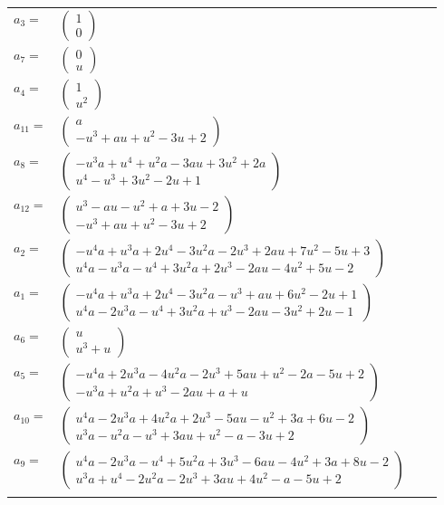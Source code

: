 \documentclass[1p]{elsarticle_modified}
\theoremstyle{definition}
\begin{document}
\begin{tabular}{m{7pt} m{180pt} m{7pt} m{180pt} }
\flushright $a_{3}=$&$\begin{pmatrix}1\\0\end{pmatrix}$ \\
\flushright $a_{7}=$&$\begin{pmatrix}0\\u\end{pmatrix}$ \\
\flushright $a_{4}=$&$\begin{pmatrix}1\\u^2\end{pmatrix}$ \\
\flushright $a_{11}=$&$\begin{pmatrix}a\\- u^3+a u+u^2-3 u+2\end{pmatrix}$ \\
\flushright $a_{8}=$&$\begin{pmatrix}- u^3 a+u^4+u^2 a-3 a u+3 u^2+2 a\\u^4- u^3+3 u^2-2 u+1\end{pmatrix}$ \\
\flushright $a_{12}=$&$\begin{pmatrix}u^3- a u- u^2+a+3 u-2\\- u^3+a u+u^2-3 u+2\end{pmatrix}$ \\
\flushright $a_{2}=$&$\begin{pmatrix}- u^4 a+u^3 a+2 u^4-3 u^2 a-2 u^3+2 a u+7 u^2-5 u+3\\u^4 a- u^3 a- u^4+3 u^2 a+2 u^3-2 a u-4 u^2+5 u-2\end{pmatrix}$ \\
\flushright $a_{1}=$&$\begin{pmatrix}- u^4 a+u^3 a+2 u^4-3 u^2 a- u^3+a u+6 u^2-2 u+1\\u^4 a-2 u^3 a- u^4+3 u^2 a+u^3-2 a u-3 u^2+2 u-1\end{pmatrix}$ \\
\flushright $a_{6}=$&$\begin{pmatrix}u\\u^3+u\end{pmatrix}$ \\
\flushright $a_{5}=$&$\begin{pmatrix}- u^4 a+2 u^3 a-4 u^2 a-2 u^3+5 a u+u^2-2 a-5 u+2\\- u^3 a+u^2 a+u^3-2 a u+a+u\end{pmatrix}$ \\
\flushright $a_{10}=$&$\begin{pmatrix}u^4 a-2 u^3 a+4 u^2 a+2 u^3-5 a u- u^2+3 a+6 u-2\\u^3 a- u^2 a- u^3+3 a u+u^2- a-3 u+2\end{pmatrix}$ \\
\flushright $a_{9}=$&$\begin{pmatrix}u^4 a-2 u^3 a- u^4+5 u^2 a+3 u^3-6 a u-4 u^2+3 a+8 u-2\\u^3 a+u^4-2 u^2 a-2 u^3+3 a u+4 u^2- a-5 u+2\end{pmatrix}$\\&\end{tabular}
\end{document}
